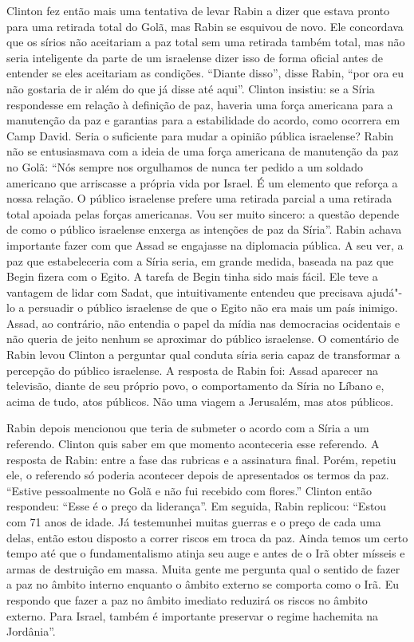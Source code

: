 Clinton fez então mais uma tentativa de levar Rabin a dizer que estava
pronto para uma retirada total do Golã, mas Rabin se esquivou de novo.
Ele concordava que os sírios não aceitariam a paz total sem uma retirada
também total, mas não seria inteligente da parte de um israelense dizer isso de
forma oficial antes de entender se eles aceitariam as condições.
``Diante disso'', disse Rabin, ``por ora eu não gostaria de ir além do
que já disse até aqui''. Clinton insistiu: se a Síria respondesse em
relação à definição de paz, haveria uma força americana para a
manutenção da paz e garantias para a estabilidade do acordo, como ocorrera
em Camp David. Seria o suficiente para mudar a opinião
pública israelense? Rabin não se entusiasmava com a ideia de uma força
americana de manutenção da paz no Golã: ``Nós sempre nos orgulhamos de
nunca ter pedido a um soldado americano que arriscasse a própria vida
por Israel. É um elemento que reforça a nossa relação. O público
israelense prefere uma retirada parcial a uma retirada total apoiada
pelas forças americanas. Vou ser muito sincero: a questão depende de
como o público israelense enxerga as intenções de paz da Síria''. Rabin
achava importante fazer com que Assad se engajasse na diplomacia pública.
A seu ver, a paz que estabeleceria com a Síria seria, em grande medida, baseada
na paz que Begin fizera com o Egito. A tarefa de Begin tinha sido mais
fácil. Ele teve a vantagem de lidar com Sadat, que intuitivamente
entendeu que precisava ajudá"-lo a persuadir o público israelense de que
o Egito não era mais um país inimigo. Assad, ao contrário, não entendia o
papel da mídia nas democracias ocidentais e não queria de jeito nenhum
se aproximar do público israelense. O comentário de Rabin levou Clinton
a perguntar qual conduta síria seria capaz de transformar a percepção do
público israelense. A resposta de Rabin foi: Assad aparecer na televisão,
diante de seu próprio povo, o comportamento da Síria no Líbano e, acima
de tudo, atos públicos. Não uma viagem a Jerusalém, mas atos públicos.

Rabin depois mencionou que teria de submeter o acordo com a Síria a um
referendo. Clinton quis saber em que momento aconteceria esse referendo.
A resposta de Rabin: entre a fase das rubricas e a assinatura final.
Porém, repetiu ele, o referendo só poderia acontecer depois de
apresentados os termos da paz. ``Estive pessoalmente no Golã e não fui
recebido com flores.'' Clinton então respondeu: ``Esse é o preço da
liderança''. Em seguida, Rabin replicou: ``Estou com 71 anos de idade.
Já testemunhei muitas guerras e o preço de cada uma delas, então estou
disposto a correr riscos em troca da paz. Ainda temos um certo tempo até
que o fundamentalismo atinja seu auge e antes de o Irã obter mísseis e
armas de destruição em massa. Muita gente me pergunta qual o sentido de
fazer a paz no âmbito interno enquanto o âmbito externo se comporta como
o Irã. Eu respondo que fazer a paz no âmbito imediato reduzirá os riscos
no âmbito externo. Para Israel, também é importante preservar o regime
hachemita na Jordânia''.

